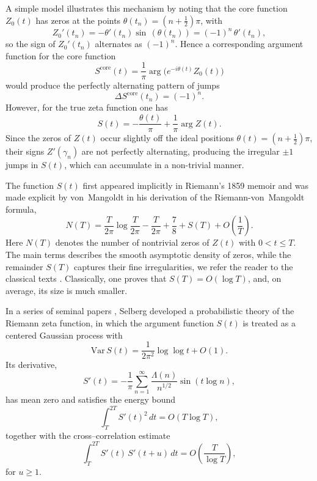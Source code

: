 \documentclass[12pt,reqno]{amsart}
\theoremstyle{plain}
\theoremstyle{definition}
\theoremstyle{remark}
\begin{document}
A simple model illustrates this mechanism by noting that the core function $Z_0(t)$ has zeros at the points $\theta(t_n)=(n+\tfrac12)\pi$, with 
\begin{equation}
Z_0'(t_n)=-\theta'(t_n)\sin\, \left ( \theta(t_n) \right ) 
=(-1)^n\,\theta'(t_n),
\end{equation}
so the sign of $Z_0'(t_n)$ alternates as $(-1)^n$.  
Hence a corresponding argument function for the core function
\begin{equation}
S^{\mathrm{core}}(t)=\frac{1}{\pi}\arg\bigl(e^{-i\theta(t)}Z_0(t)\bigr)
\end{equation}
would produce the perfectly alternating pattern of jumps
\begin{equation}
\Delta S^{\mathrm{core}}(t_n)=(-1)^n.
\end{equation}
However, for the true zeta function one has 
\begin{equation}
S(t)=-\frac{\theta(t)}{\pi}+\frac{1}{\pi}\arg Z(t).
\end{equation}
Since the zeros of $Z(t)$ occur slightly off the ideal positions $\theta(t)=\left ( n +\frac{1}{2} \right ) \pi$, their signs $Z'(\gamma_n)$ are not perfectly alternating, producing the irregular $\pm1$ jumps in $S(t)$, which can accumulate in a non-trivial manner. 

The function $S(t)$ first appeared implicitly in Riemann’s 1859 memoir \cite{R} and
was made explicit by von~Mangoldt in his derivation of the Riemann-von~Mangoldt formula,
\begin{equation}\label{eq:RvM}
N(T)
=\frac{T}{2\pi}\log\frac{T}{2\pi}
-\frac{T}{2\pi}
+\frac{7}{8}
+S(T)
+O\!\left(\frac{1}{T}\right).
\end{equation}
Here $N(T)$ denotes the number of nontrivial zeros of $Z(t)$ with $0<t \le T$.  
The main terms describes the smooth asymptotic density of zeros, 
while the remainder $S(T)$ captures their fine irregularities, we refer the reader to the classical texts \cite{E,T}.  
Classically, one proves that $S(T)=O(\log T)$, 
and, on average, its size is much smaller. 


In a series of seminal papers \cite{Selberg1946,Selberg1947,
Selberg1989CLT,
SelbergCollectedPapers1989}, 
Selberg developed a probabilistic theory of the Riemann zeta function, 
in which the argument function 
$S(t)$ is treated as a centered Gaussian process with
\begin{equation}
\mathrm{Var}\,S(t)=\frac{1}{2\pi^2}\log\log t+O(1).
\end{equation}
Its derivative,
\begin{equation}
S'(t)
=-\frac{1}{\pi}\sum_{n=1}^{\infty}\frac{\Lambda(n)}{n^{1/2}}\sin(t\log n),
\end{equation}
has mean zero and satisfies the energy bound
\begin{equation}
\label{eq:SelbergEnergy}
\int_T^{2T} S'(t)^2\,dt =O(T\log T),
\end{equation}
together with the cross–correlation estimate
\begin{equation}
\label{eq:SelbergCross}
\int_T^{2T} S'(t)\,S'(t+u)\,dt
=O\!\left(\frac{T}{\log T}\right),
\end{equation}
for $u\ge1$.
\end{document}
